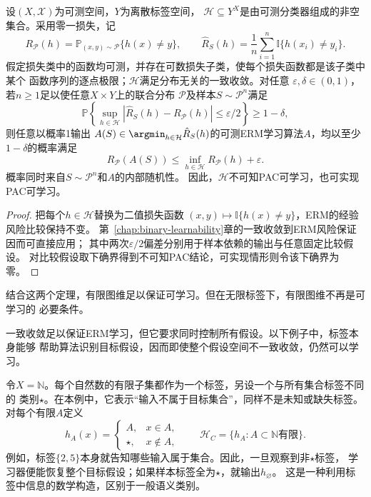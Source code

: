 \begin{theorem}[一致收敛推出可学习性]
\label{thm:multiclass-uniform-pac}
设$(X,\mathcal X)$为可测空间，$Y$为离散标签空间，
$\mathcal H\subseteq Y^X$是由可测分类器组成的非空集合。采用零一损失，记
\[
 R_{\mathcal P}(h)=\mathbb P_{(x,y)\sim\mathcal P}\{h(x)\neq y\},\qquad
 \hat R_S(h)=\frac1n\sum_{i=1}^n\mathbb I\{h(x_i)\neq y_i\}.
\]
假定损失类中的函数均可测，并存在可数损失子类，使每个损失函数都是该子类中某个
函数序列的逐点极限；$\mathcal H$满足分布无关的一致收敛。对任意
$\varepsilon,\delta\in(0,1)$，若$n\geq1$足以使任意$X\times Y$上的联合分布
$\mathcal P$及样本$S\sim\mathcal P^n$满足
\[
 \mathbb P\!\left\{
 \sup_{h\in\mathcal H}|\hat R_S(h)-R_{\mathcal P}(h)|\leq\varepsilon/2
 \right\}\geq1-\delta,
\]
则任意以概率1输出
$A(S)\in\argmin_{h\in\mathcal H}\hat R_S(h)$的可测ERM学习算法$A$，均以至少
$1-\delta$的概率满足
\[
 R_{\mathcal P}(A(S))\leq\inf_{h\in\mathcal H}R_{\mathcal P}(h)+\varepsilon.
\]
概率同时来自$S\sim\mathcal P^n$和$A$的内部随机性。
因此，$\mathcal H$不可知PAC可学习，也可实现PAC可学习。
\end{theorem}

\begin{proof}
把每个$h\in\mathcal H$替换为二值损失函数
$(x,y)\mapsto\mathbb I\{h(x)\neq y\}$，ERM的经验风险比较保持不变。
第~\ref{chap:binary-learnability}章的一致收敛到ERM风险保证因而可直接应用；
其中两次$\varepsilon/2$偏差分别用于样本依赖的输出与任意固定比较假设。
对比较假设取下确界得到不可知PAC结论，可实现情形则令该下确界为零。
\end{proof}

结合这两个定理，有限图维足以保证可学习。但在无限标签下，有限图维不再是可学习的
必要条件。

一致收敛足以保证ERM学习，但它要求同时控制所有假设。以下例子中，标签本身能够
帮助算法识别目标假设，因而即使整个假设空间不一致收敛，仍然可以学习。

令$X=\mathbb N$。每个自然数的有限子集都作为一个标签，另设一个与所有集合标签不同的
类别$\star$。在本例中，它表示“输入不属于目标集合”，同样不是未知或缺失标签。
对每个有限$A$定义
\begin{equation}
 h_A(x)=\begin{cases}A,&x\in A,\\\star,&x\notin A,\end{cases}
 \qquad\mathcal H_C=\{h_A:A\subset\mathbb N\text{有限}\}.
 \label{eq:cantor-class}
\end{equation}
例如，标签$\{2,5\}$本身就告知哪些输入属于集合。因此，一旦观察到非$\star$标签，
学习器便能恢复整个目标假设；如果样本标签全为$\star$，就输出$h_{\varnothing}$。
这是一种利用标签中信息的数学构造，区别于一般语义类别。

